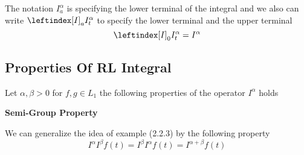\begin{enrichment*}{}
    The notation $I_a^{\alpha}$ is specifying the lower terminal of the integral and we also can write 
    $\leftindex[I]_a {I_t^{\alpha}}$ to specify the lower terminal and the upper terminal 
    \[
        \leftindex[I]_0 {I_t^{\alpha}} = I^{\alpha}
    \]
\end{enrichment*}
\newpage
\subsection{Properties Of RL Integral}
Let $\alpha , \beta >0 $ for $f,g \in L_1$ the following properties of the operator $I^\alpha$ holds
\begin{property}
    \textbf{Semi-Group Property}
\end{property}
We can generalize the idea of example (2.2.3) by the following property
\[
    I^{\alpha} I^{\beta} f(t) = I^{\beta} I^{\alpha} f(t) = I^{\alpha+\beta} f(t)
\]
